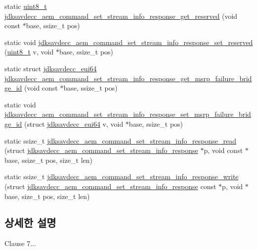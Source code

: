 \begin{DoxyCompactItemize}
\item 
static \hyperlink{stdint_8h_aba7bc1797add20fe3efdf37ced1182c5}{uint8\+\_\+t} \hyperlink{group__command__set__stream__info__response_ga1c3913ba2a73d32be2588f8b5ebc18e0}{jdksavdecc\+\_\+aem\+\_\+command\+\_\+set\+\_\+stream\+\_\+info\+\_\+response\+\_\+get\+\_\+reserved} (void const $\ast$base, ssize\+\_\+t pos)
\item 
static void \hyperlink{group__command__set__stream__info__response_ga4bbe3a7abc533bef3ca6a62fa886a788}{jdksavdecc\+\_\+aem\+\_\+command\+\_\+set\+\_\+stream\+\_\+info\+\_\+response\+\_\+set\+\_\+reserved} (\hyperlink{stdint_8h_aba7bc1797add20fe3efdf37ced1182c5}{uint8\+\_\+t} v, void $\ast$base, ssize\+\_\+t pos)
\item 
static struct \hyperlink{structjdksavdecc__eui64}{jdksavdecc\+\_\+eui64} \hyperlink{group__command__set__stream__info__response_ga1637cf4940f6372ba5c31d9a96040ebd}{jdksavdecc\+\_\+aem\+\_\+command\+\_\+set\+\_\+stream\+\_\+info\+\_\+response\+\_\+get\+\_\+msrp\+\_\+failure\+\_\+bridge\+\_\+id} (void const $\ast$base, ssize\+\_\+t pos)
\item 
static void \hyperlink{group__command__set__stream__info__response_ga246c9e19f8dec3f5f0b6f6984907a623}{jdksavdecc\+\_\+aem\+\_\+command\+\_\+set\+\_\+stream\+\_\+info\+\_\+response\+\_\+set\+\_\+msrp\+\_\+failure\+\_\+bridge\+\_\+id} (struct \hyperlink{structjdksavdecc__eui64}{jdksavdecc\+\_\+eui64} v, void $\ast$base, ssize\+\_\+t pos)
\item 
static ssize\+\_\+t \hyperlink{group__command__set__stream__info__response_ga72d3970a9748704a943c2252f668a52a}{jdksavdecc\+\_\+aem\+\_\+command\+\_\+set\+\_\+stream\+\_\+info\+\_\+response\+\_\+read} (struct \hyperlink{structjdksavdecc__aem__command__set__stream__info__response}{jdksavdecc\+\_\+aem\+\_\+command\+\_\+set\+\_\+stream\+\_\+info\+\_\+response} $\ast$p, void const $\ast$base, ssize\+\_\+t pos, size\+\_\+t len)
\item 
static ssize\+\_\+t \hyperlink{group__command__set__stream__info__response_gae6042bf21ef027d418f6a7ab1d278c69}{jdksavdecc\+\_\+aem\+\_\+command\+\_\+set\+\_\+stream\+\_\+info\+\_\+response\+\_\+write} (struct \hyperlink{structjdksavdecc__aem__command__set__stream__info__response}{jdksavdecc\+\_\+aem\+\_\+command\+\_\+set\+\_\+stream\+\_\+info\+\_\+response} const $\ast$p, void $\ast$base, size\+\_\+t pos, size\+\_\+t len)
\end{DoxyCompactItemize}


\subsection{상세한 설명}
Clause 7... 

